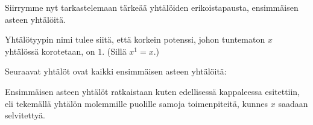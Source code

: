 Siirrymme nyt tarkastelemaan tärkeää yhtälöiden erikoistapausta, ensimmäisen asteen yhtälöitä.


Yhtälötyypin nimi tulee siitä, että korkein potenssi, johon tuntematon $x$ yhtälössä korotetaan, on $1$. (Sillä $x^1=x$.)

\begin{esimerkki}
Seuraavat yhtälöt ovat kaikki ensimmäisen asteen yhtälöitä:
\end{esimerkki}


%		

Ensimmäisen asteen yhtälöt ratkaistaan kuten edellisessä kappaleessa esitettiin, eli tekemällä yhtälön molemmille puolille  samoja toimenpiteitä, kunnes $x$ saadaan selvitettyä. 

